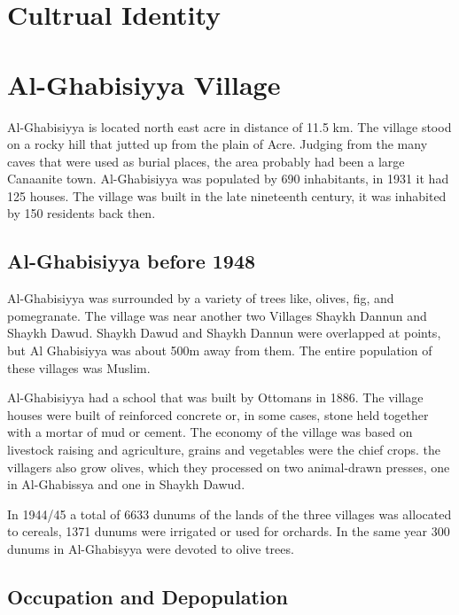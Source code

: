 \section{Cultrual Identity}

\section{Al-Ghabisiyya Village}

Al-Ghabisiyya is located north east acre in distance of 11.5 km. The village stood on a rocky hill that jutted up from the plain of Acre. Judging from the many caves that were used as burial places, the area probably had been a large Canaanite town.
Al-Ghabisiyya was populated by 690 inhabitants, in 1931 it had 125 houses. The village was built in the late nineteenth century, it was inhabited by 150 residents back then\citep{Khalidi2015}.
\subsection{Al-Ghabisiyya before 1948}

 Al-Ghabisiyya was surrounded by a variety of trees like, olives, fig, and pomegranate. The village was near another two Villages Shaykh Dannun and Shaykh Dawud. Shaykh Dawud and Shaykh Dannun were overlapped at points, but Al Ghabisiyya was about 500m away from them. The entire population of these villages was Muslim. 

Al-Ghabisiyya had a school that was built by Ottomans in 1886. The village houses were built of reinforced concrete or, in some cases, stone held together with a mortar of mud or cement. The economy of the village was based on livestock raising and agriculture, grains and vegetables were the chief crops. the villagers also grow olives, which they processed on two animal-drawn presses, one in Al-Ghabissya and one in Shaykh Dawud.

In 1944/45 a total of 6633 dunums of the lands of the three villages was allocated to cereals, 1371 dunums were irrigated or used for orchards. In the same year 300 dunums in Al-Ghabisyya were devoted to olive trees\citep{Khalidi2015}.

\subsection{Occupation and Depopulation}

